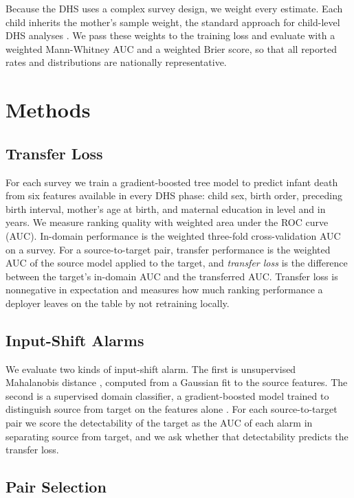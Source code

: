 \documentclass[letterpaper]{article} %
\begin{document}
Because the DHS uses a complex survey design, we weight every estimate. Each child inherits the mother's sample weight, the standard approach for child-level DHS analyses \citep{croft2018guide}. We pass these weights to the training loss and evaluate with a weighted Mann-Whitney AUC and a weighted Brier score, so that all reported rates and distributions are nationally representative.

\section{Methods}

\subsection{Transfer Loss}

For each survey we train a gradient-boosted tree model \citep{chen2016xgboost} to predict infant death from six features available in every DHS phase: child sex, birth order, preceding birth interval, mother's age at birth, and maternal education in level and in years. We measure ranking quality with weighted area under the ROC curve (AUC). In-domain performance is the weighted three-fold cross-validation AUC on a survey. For a source-to-target pair, transfer performance is the weighted AUC of the source model applied to the target, and \emph{transfer loss} is the difference between the target's in-domain AUC and the transferred AUC. Transfer loss is nonnegative in expectation and measures how much ranking performance a deployer leaves on the table by not retraining locally.

\subsection{Input-Shift Alarms}

We evaluate two kinds of input-shift alarm. The first is unsupervised Mahalanobis distance \citep{lee2018mahalanobis}, computed from a Gaussian fit to the source features. The second is a supervised domain classifier, a gradient-boosted model trained to distinguish source from target on the features alone \citep{quionero2009dataset}. For each source-to-target pair we score the detectability of the target as the AUC of each alarm in separating source from target, and we ask whether that detectability predicts the transfer loss.

\subsection{Pair Selection}
\end{document}
